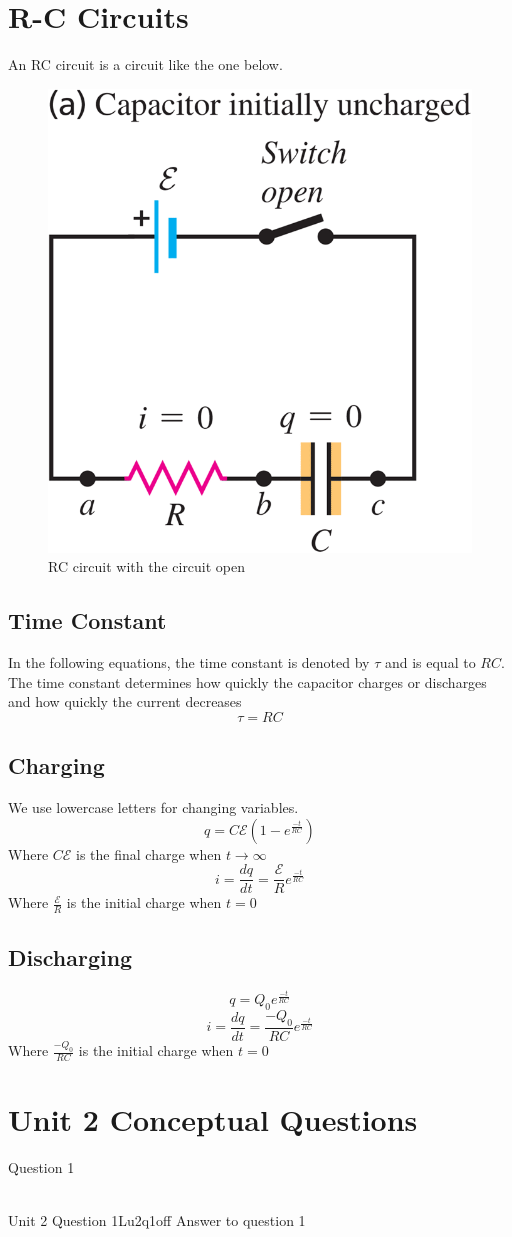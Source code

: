 \documentclass[10pt, a4paper, twocolumn]{article}
\begin{document}
    \section{R-C Circuits}
        An RC circuit is a circuit like the one below.\\
        \begin{figure}[H]
            \includegraphics[width=0.5\linewidth]{RC} %
            \caption{RC circuit with the circuit open}
        \end{figure}
        \subsection{Time Constant}
        In the following equations, the time constant is denoted by $\tau$ and is equal to $RC$. The time constant determines how quickly the capacitor charges or discharges and how quickly the current decreases\\
        $$\tau = RC$$
        \subsection{Charging}
        We use lowercase letters for changing variables.\\
        $$q = C\mathcal{E} (1 - e^{\frac{-t}{RC}})$$
        Where $C\mathcal{E}$ is the final charge when $t \rightarrow \infty$\\
        $$i = \frac{dq}{dt} = \frac{\mathcal{E}}{R} e^{\frac{-t}{RC}}$$
        Where $\frac{\mathcal{E}}{R}$ is the initial charge when $t = 0$\\
        \subsection{Discharging}
        $$q = Q_0 e^{\frac{-t}{RC}}$$
        $$i = \frac{dq}{dt} = \frac{-Q_0}{RC} e^{\frac{-t}{RC}}$$
        Where $\frac{-Q_0}{RC}$ is the initial charge when $t = 0$\\

    \section{Unit 2 Conceptual Questions}
    Question 1\\
    \\
    \begin{ocg}{Unit 2 Question 1}{Lu2q1}{off}
        Answer to question 1
    \end{ocg}
\end{document}
